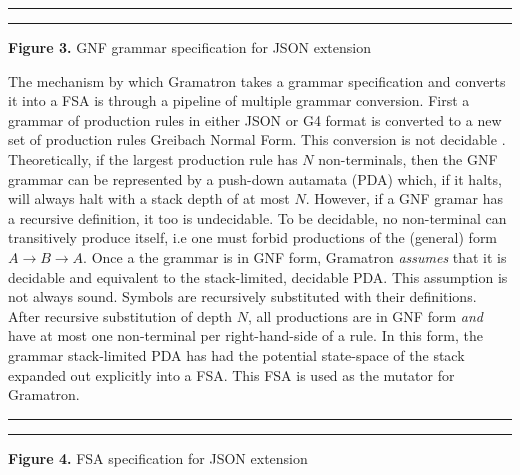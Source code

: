 \documentclass[12pt]{diazessay}
\begin{document}
\vspace{10mm}
\hrule height 0.4mm
\begingroup \fontsize{10pt}{10pt} \selectfont \begin{alltt}

\end{alltt} \vspace{-6mm} \endgroup \hrule height 0.4mm
\vspace{6mm}
\centerline{\textbf{Figure 3.} GNF grammar specification for JSON extension}
\vspace{6mm}

The mechanism by which Gramatron takes a grammar specification and converts it into a FSA is through a pipeline of multiple grammar conversion.
First a grammar of production rules in either JSON or G4\cite{parr2013definitive} format is converted to a new set of production rules Greibach Normal Form.
This conversion is not decidable \cite{yu1997regular}.
Theoretically, if the largest production rule has $N$ non-terminals, then the GNF grammar can be represented by a push-down autamata (PDA) which, if it halts, will always halt with a stack depth of at most $N$.
However, if a GNF gramar has a recursive definition, it too is undecidable.
To be decidable, no non-terminal can transitively produce itself, i.e one must forbid productions of the (general) form $A \to B \to A$.
Once a the grammar is in GNF form, Gramatron \emph{assumes} that it is decidable and equivalent to the stack-limited, decidable PDA.
This assumption is not always sound.
Symbols are recursively substituted with their definitions.
After recursive substitution of depth $N$, all productions are in GNF form \emph{and} have at most one non-terminal per right-hand-side of a rule.
In this form, the grammar stack-limited PDA has had the potential state-space of the stack expanded out explicitly into a FSA.
This FSA is used as the mutator for Gramatron.

\vspace{10mm}
\hrule height 0.4mm
\begingroup \fontsize{10pt}{10pt} \selectfont \begin{alltt}

\end{alltt} \vspace{-6mm} \endgroup \hrule height 0.4mm
\vspace{6mm}
\centerline{\textbf{Figure 4.} FSA specification for JSON extension}
\vspace{6mm}
\end{document}
